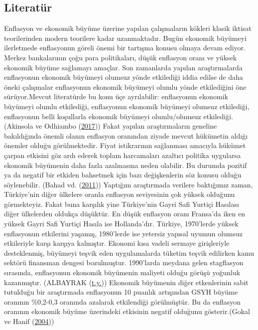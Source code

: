 \documentclass[
  12pt,
]{article}
\begin{document}
\hypertarget{literatuxfcr}{%
\subsection{Literatür}\label{literatuxfcr}}

Enflasyon ve ekonomik büyüme üzerine yapılan çalışmaların kökleri klasik iktisat teorilerinden modern teorilere kadar uzanmaktadır. Bugün ekonomik büyümeyi ilerletmede enflasyonun göreli önemi bir tartışma konusu olmaya devam ediyor. Merkez bankalarının çoğu para politikaları, düşük enflasyon oranı ve yüksek ekonomik büyüme sağlamayı amaçlar.
Son zamanlarda yapılan araştırmalarda enflasyonun ekonomik büyümeyi olumsuz yönde etkilediği iddia edilse de daha öneki çalışmalar enflasyonun ekonomik büyümeyi olumlu yönde etkilediğini öne sürüyor.Mevcut literatürde bu konu üçe ayrılabilir: enflasyonun ekonomik büyümeyi olumlu etkilediği, enflasyonun ekonomik büyümeyi olumsuz etkilediği, enflasyonun belli koşullarla ekonomik büyümeyi olumlu/olumsuz etkilediği. (Akinsola ve Odhiambo (\protect\hyperlink{ref-akinsola2017inflation}{2017}))
Fakat yapılan araştırmaların geneline bakıldığında önemli olanın enflasyon oranından ziyade mevcut hükümetin aldığı önemler olduğu görülmektedir. Fiyat istikrarının sağlanması amacıyla hükümet çarpan etkisini göz ardı ederek toplam harcamaları azaltıcı politika uygularsa ekonomik büyümenin daha fazla azalmasına neden olabilir. Bu durumda pozitif ya da negatif bir etkiden bahsetmek için bazı değişkenlerin söz konusu olduğu söylenebilir. (Bahad vd. (\protect\hyperlink{ref-bahad2011enflasyon}{2011}))
Yaptığım araştırmada verilere baktığımız zaman, Türkiye'nin diğer ülkelere oranla enflasyon seviyesinin çok yüksek olduğunu görmekteyiz. Fakat buna karşılık yine Türkiye'nin Gayri Safi Yurtiçi Hasılası diğer ülkelerden oldukça düşüktür. En düşük enflasyon oranı Fransa'da iken en yüksek Gayri Safi Yurtiçi Hasıla ise Hollanda'dır.
Türkiye, 1970'lerde yüksek enflasyonun etkilerini yaşamış, 1980'lerde ise yetersiz yapısal uyumun olumsuz etkileriyle karşı karşıya kalmıştır. Ekonomi kısa vadeli sermaye girişleriyle desteklenmiş, büyümeyi teşvik eden uygulamalarda tüketim teşvik edilirken kamu sektörü finansman dengesi bozulmuştur. 1990'larda meydana gelen stagflasyon sırasında, enflasyonun ekonomik büyümenin maliyeti olduğu görüşü yoğunluk kazanmıştır. (ALBAYRAK (\protect\hyperlink{ref-albayrak9ekonomik}{t.y.}))
Ekonomik büyümenin diğer etkenlerinin sabit tutulduğu bir araştırmada enflasyonun 10 puanlık artışından GSYH büyüme oranının \%0,2-0,3 oranında azalarak etkilendiği görülmüştür. Bu da enflasyon oranının ekonomik büyüme üzerindeki etkisinin negatif olduğunu gösterir.(Gokal ve Hanif (\protect\hyperlink{ref-gokal2004relationship}{2004}))
\end{document}
